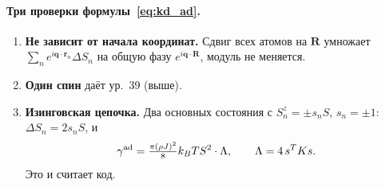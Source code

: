 \paragraph{Три проверки формулы~\eqref{eq:kd_ad}.}
\begin{enumerate}
\item \textbf{Не зависит от начала координат.} Сдвиг всех атомов на $\mathbf R$
  умножает $\sum_ne^{i\mathbf q\cdot\mathbf r_n}\Delta S_n$ на общую фазу $e^{i\mathbf q\cdot\mathbf R}$, модуль не
  меняется.
\item \textbf{Один спин} даёт ур.~39 (выше).
\item \textbf{Изинговская цепочка.} Два основных состояния с $S^z_n=\pm s_nS$,
  $s_n=\pm1$: $\Delta S_n=2s_nS$, и
  \[
  \gamma^{\rm ad}=\tfrac{\pi(\rho J)^2}{8}k_BTS^2\cdot\Lambda,\qquad \Lambda=4\,s^TKs .
  \]
  Это и считает код.
\end{enumerate}

